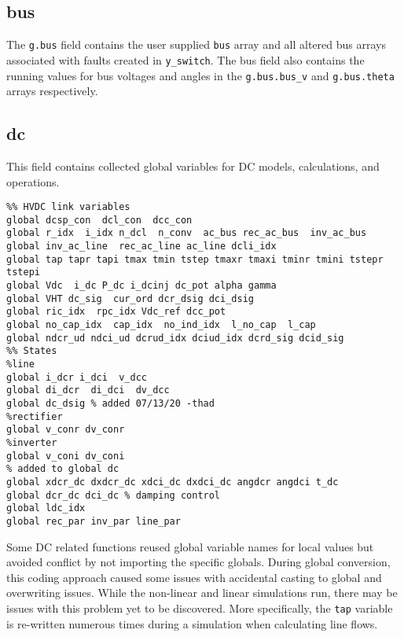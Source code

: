 \subsection{bus}  
The \verb|g.bus| field contains the user supplied \verb|bus| array and all altered bus arrays associated with faults created in \verb|y_switch|.
The bus field also contains the running values for bus voltages and angles in the \verb|g.bus.bus_v| and \verb|g.bus.theta| arrays respectively.


\subsection{dc}
This field contains collected global variables for DC models, calculations, and operations.
\begin{verbatim}
%% HVDC link variables 
global dcsp_con  dcl_con  dcc_con
global r_idx  i_idx n_dcl  n_conv  ac_bus rec_ac_bus  inv_ac_bus
global inv_ac_line  rec_ac_line ac_line dcli_idx
global tap tapr tapi tmax tmin tstep tmaxr tmaxi tminr tmini tstepr tstepi
global Vdc  i_dc P_dc i_dcinj dc_pot alpha gamma 
global VHT dc_sig  cur_ord dcr_dsig dci_dsig
global ric_idx  rpc_idx Vdc_ref dcc_pot
global no_cap_idx  cap_idx  no_ind_idx  l_no_cap  l_cap
global ndcr_ud ndci_ud dcrud_idx dciud_idx dcrd_sig dcid_sig
%% States
%line
global i_dcr i_dci  v_dcc
global di_dcr  di_dci  dv_dcc
global dc_dsig % added 07/13/20 -thad
%rectifier
global v_conr dv_conr
%inverter
global v_coni dv_coni
% added to global dc
global xdcr_dc dxdcr_dc xdci_dc dxdci_dc angdcr angdci t_dc
global dcr_dc dci_dc % damping control
global ldc_idx
global rec_par inv_par line_par
\end{verbatim}

Some DC related functions reused global variable names for local values but avoided conflict by not importing the specific globals.
During global conversion, this coding approach caused some issues with accidental casting to global and overwriting issues.
While the non-linear and linear simulations run, there may be issues with this problem yet to be discovered.
More specifically, the \verb|tap| variable is re-written numerous times during a simulation when calculating line flows.




